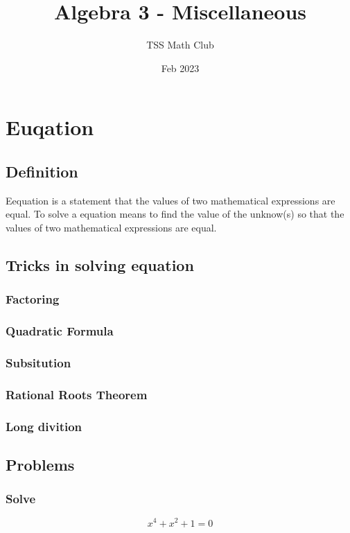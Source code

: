 \documentclass{article}
\title{Algebra 3 - Miscellaneous}
\author{TSS Math Club}
\date{Feb 2023}
\begin{document}
\large

\maketitle

\section{Euqation}

\subsection{Definition}
Eequation is a statement that the values of two mathematical expressions are equal.
To solve a equation means to find the value of the unknow(s) so that the values of two mathematical expressions are equal.

\subsection{Tricks in solving equation}

\subsubsection{Factoring}
\vspace{40px}
\subsubsection{Quadratic Formula}
\vspace{40px}
\subsubsection{Subsitution}
\vspace{40px}
\subsubsection{Rational Roots Theorem}
\vspace{40px}
\subsubsection{Long divition}
\vspace{40px}
\pagebreak
\subsection{Problems}
\subsubsection{Solve}
$$x^4+x^2+1=0$$
\vspace{40px}
\end{document}
